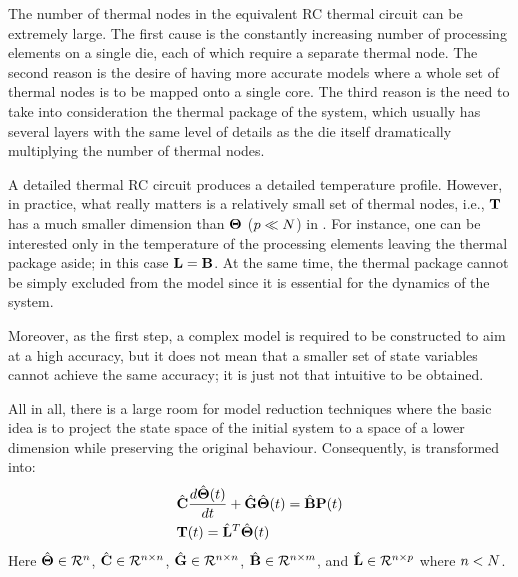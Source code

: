 The number of thermal nodes in the equivalent RC thermal circuit can be extremely large. The first cause is the constantly increasing number of processing elements on a single die, each of which require a separate thermal node. The second reason is the desire of having more accurate models where a whole set of thermal nodes is to be mapped onto a single core. The third reason is the need to take into consideration the thermal package of the system, which usually has several layers with the same level of details as the die itself dramatically multiplying the number of thermal nodes.

A detailed thermal RC circuit produces a detailed temperature profile. However, in practice, what really matters is a relatively small set of thermal nodes, i.e., $\mathbf{T}$ has a much smaller dimension than $\mathbf{\Theta}$ ($p \ll N$) in . For instance, one can be interested only in the temperature of the processing elements leaving the thermal package aside; in this case $\mathbf{L} = \mathbf{B}$. At the same time, the thermal package cannot be simply excluded from the model since it is essential for the dynamics of the system.

Moreover, as the first step, a complex model is required to be constructed to aim at a high accuracy, but it does not mean that a smaller set of state variables cannot achieve the same accuracy; it is just not that intuitive to be obtained.

All in all, there is a large room for model reduction techniques \cite{antoulas2001} where the basic idea is to project the state space of the initial system to a space of a lower dimension while preserving the original behaviour. Consequently,  is transformed into:
\begin{align}
  & \r{\mCap} \frac{d\r{\vTemp}(\time)}{d\time} + \r{\mCond} \r{\vTemp}(\time) = \r{\mIn} \vPower(\time)  \equlabel{reduced-fourier} \\
  & \vOutTemp(\time) = \r{\mOut}^T \r{\vTemp}(\time) \nonumber
\end{align}
Here $\hat{\mathbf{\Theta}} \in \mathcal{R}^{n}$, $\hat{\mathbf{C}} \in \mathcal{R}^{n \times n}$, $\hat{\mathbf{G}} \in \mathcal{R}^{n \times n}$, $\hat{\mathbf{B}} \in \mathcal{R}^{n \times m}$, and $\hat{\mathbf{L}} \in \mathcal{R}^{n \times p}$ where $n < N$.
